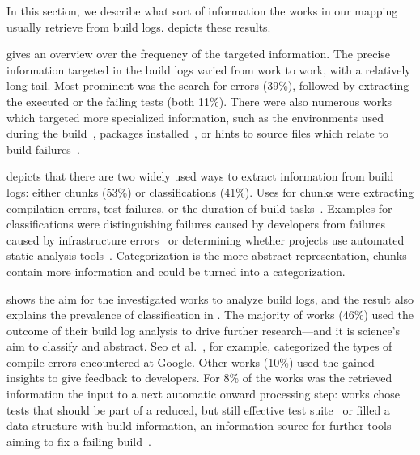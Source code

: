 In this section, we describe what sort of information the works in
our mapping usually retrieve from build logs.
 depicts these results.

 gives an overview over the frequency of
the targeted information.
The precise information targeted in the build logs varied from work
to work, with a relatively long tail.
Most prominent was the search for errors (39\%), followed by extracting
the executed or the failing
tests (both 11\%).
There were also numerous works which targeted more specialized
information, such as the environments used during the
build~\citep{zolfagharinia2017not}, packages
installed~\citep{selberg2012use}, or hints to source files which
relate to build failures~\citep{ren2018automated}.

 depicts that there are two widely used ways to
extract information from build logs: either chunks (53\%) or
classifications (41\%).
Uses for chunks were extracting compilation errors,
test failures, or the duration of build
tasks~\citep{clemencic2014new,zhang2016android}.
Examples for
classifications were distinguishing failures caused by developers from
failures caused by infrastructure errors~\citep{lindqvist2019detection}
or determining whether projects use automated static analysis
tools~\citep{kavaler2019tool}.
Categorization is the more abstract representation, chunks
contain more information and could be turned into a categorization.

 shows the aim for the
investigated works to analyze build logs, and the result also explains
the prevalence of classification in .
The majority of works (46\%) used the outcome of their build log
analysis to drive further research---and it is science's aim to
classify and abstract.
Seo et al.~\citep{seo2014programmers}, for example,
categorized the types of compile errors encountered at
Google.
Other works (10\%) used the gained insights to give feedback to
developers.
For 8\% of the works was the retrieved information the input
to a next automatic onward processing step:
works chose
tests that should be part of a reduced, but still effective test
suite~\citep{shi2018evaluating} or filled     a data structure with
build information, an information source for further tools aiming
to fix a failing build~\citep{vassallo2018un-break}.

